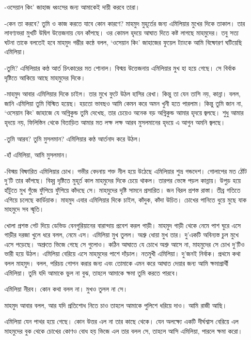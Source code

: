 \documentclass[
]{book}
\begin{document}
-ওসেয়ান কিং' জাহাজ ধ্বংসের জন্য আমাকেই দায়ী করবে তারা।

-কেন তা করবে? তুমি ও কাজ করতে যাবে কোন কারণে? মাহমুদ মুহূর্তের জন্য এমিলিয়ার মুখের দিকে তাকাল। তার লাবণ্যভরা মুখটি উদ্বিগ উত্তেজনায় যেন কাঁপছে। ওর কোমল হৃদয়ে আঘাত দিতে কষ্ট লাগছে মাহমুদের। তবু সত্য ঘটনা তাকে বলতেই হবে মাহমুদ গম্ভীর কন্ঠে বলল, `ওসেয়ান কিং' জাহাজের ফুয়েল ট্যাংকে আমি বিষ্ফোরণ ঘটিয়েছি এমিলিয়া।

-তুমি? এমিলিয়ার কণ্ঠ আর্ত চিৎকারের মত শোনাল। বিস্ময় উত্তেজনায় এমিলিয়ার মুখ হা হয়ে গেছে। সে বির্বাক দৃষ্টিতে আকিয়ে আছে মাহমুদের দিকে।

-মাহমুদ আবার এমিলিয়ার দিকে চাইল। তার মুখে ফুটে উঠল হাসির রেখা। কিন্তু তা যেন তাসি নয়, কান্না। বলল, জানি এমিলিয়া তুমি বিস্মিত হয়েছ। হয়তো ভাবছও আমি কেমন করে অমন খুনী হতে পারলাম। কিন্তু তুমি জান না, `ওসেয়ান কিং' জাহাজে যে অগ্নিকুন্ড তুমি দেখেছ, তার চেয়েও অনেক বড় অগ্নিকুন্ড আমার হৃদয়ে জ্বলছে। শুধু আমার হৃদয়ে নয়, ফিলিস্তিন থেকে বিতাড়িত আমার মত লক্ষ লক্ষ আরব মুসলমানের হৃদয়ে এ আগুন অমনি জ্বলছে।

-তুমি আরব? তুমি মুসলমান? এমিলিয়ার কণ্ঠ আর্তনাদ করে উঠল।

-হাঁ এমিলিয়া, আমি মুসলমান।

-বিস্ময় বিষ্ফারিত এমিলিয়ার চোখ। গভীর বেদনায় শক্ত নীল হয়ে উঠেছে এমিলিয়ার শুভ্র গন্ডদেশ। গোলাপের মত ঠোঁট দু'টি তার কাঁপছে। বিহ্ব্ল দৃষ্টিতে মুহূর্ত কাল মাহমুদের দিকে চেয়ে থাকল। তারপর ভেঙ্গে পড়ল কান্নায়। উপুড় হয়ে হাঁটুতে মুখ গুঁজে ফুঁপিয়ে ফুঁপিয়ে কাঁদছে সে। মাহমুদের দৃষ্টি সামনে প্রসারিত। জন বিরল প্রশস্ত রাস্তা। তীব্র গতিতে এগিয়ে চলেছে কার্ডিয়াক। মাহমুদ এবার এমিলিয়ার দিকে চাইল, কাঁদুক, কাঁদা উচিত। চোখের পানিতে ধুয়ে মুছে যাক মাহমুদে সব স্মৃতি।

খোলা প্রশস্ত গেট দিয়ে ডেভিড বেনগুরিয়ানের বারান্দায় প্রবেশ করল গাড়ী। মাহমুদ গাড়ী থেকে নেমে পাশ ঘুরে এসে গাড়ীর দরজা খুলে ধরে বলল, নেমে এস। এমিলিয়া মুখ তুলল। অশ্রু ধোয়া মুখ তার। দু'একটি অবিন্যস্ত চুল মুখে এসে পড়েছে। অশ্রুতে ভিজে গেছে সে গুলোও। কঠিন আঘাতে যে চোখে অশ্রু আসে না, মাহমুদের সে চোখ দু'টিও ভারী হয়ে উঠল। এমিলিয়া বেরিয়ে এসে মাহমুদের পাশে দাঁড়াল। নতমুখী এমিলিয়া। দু'জনই নির্বাক। প্রথমে কথা বলল মাহমুদ। বলল, পরিচয় গোপন করার জন্য এবং তোমাকে এমন করে আঘাত দেয়ার জন্য আমি ক্ষমাপ্রার্থী এমিলিয়া। তুমি যদি আমাকে ভুল না বুঝ, তাহলে আমাকে ক্ষমা তুমি করতে পারবে।

এমিলিয়া নীরব। কোন কথা বলল না। মুখও তুলল না সে।

মাহমুদ আবার বলল, আর যদি প্রতিশোধ নিতে চাও তাহলে আমাকে পুলিশে ধরিয়ে দাও। আমি রাজী আছি।

এমিলিয়া যেন পাথর হয়ে গেছে। কোন উত্তর এল না তার কাছে থেকে। যেন অলক্ষ্যে একটি দীর্ঘশ্বাস বেরিয়ে এল মাহমুদের বুক থেকে চোখের কোণও বোধ হয় ভিজে এল তার বলল সে, তাহলে আসি এমিলিয়া, পারলে ক্ষমা করো।
\end{document}
